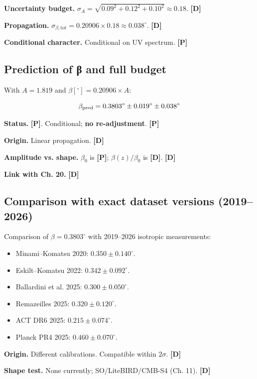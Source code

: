 ﻿\documentclass[11pt,letterpaper]{article}
\begin{document}
\textbf{Uncertainty budget.} $\sigma_A = \sqrt{0{.}09^2 + 0{.}12^2 + 0{.}10^2} \approx 0{.}18$. \textbf{[D]}

\textbf{Propagation.} $\sigma_{\beta,\text{tot}} = 0{.}20906 \times 0{.}18 \approx 0{.}038^\circ$. \textbf{[D]}

\textbf{Conditional character.} Conditional on UV spectrum. \textbf{[P]}
\subsection{Prediction of β and full budget}
With $A = 1{.}819$ and $\beta[^\circ] = 0{.}20906 \times A$:

\begin{equation*}
  \resizebox{\ifdim\width>\linewidth \linewidth\else\width\fi}{!}{$\displaystyle \beta_{\text{pred}} = 0{.}3803^\circ \pm 0{.}019^\circ \pm 0{.}038^\circ$}
\end{equation*}

\textbf{Status.} \textbf{[P]}. Conditional; \textbf{no re-adjustment}. \textbf{[P]}

\textbf{Origin.} Linear propagation. \textbf{[D]}

\textbf{Amplitude vs. shape.} $\beta_0$ is \textbf{[P]}; $\beta(z)/\beta_0$ is \textbf{[D]}. \textbf{[D]}

\textbf{Link with Ch. 20.} \textbf{[D]}
\subsection{Comparison with exact dataset versions (2019–2026)}
Comparison of $\beta = 0{.}3803^\circ$ with 2019--2026 isotropic measurements:

\begin{itemize}[leftmargin=*]
\item Minami--Komatsu 2020: $0{.}350 \pm 0{.}140^\circ$.
\item Eskilt--Komatsu 2022: $0{.}342 \pm 0{.}092^\circ$.
\item Ballardini et al. 2025: $0{.}300 \pm 0{.}050^\circ$.
\item Remazeilles 2025: $0{.}320 \pm 0{.}120^\circ$.
\item ACT DR6 2025: $0{.}215 \pm 0{.}074^\circ$.
\item Planck PR4 2025: $0{.}460 \pm 0{.}070^\circ$.
\end{itemize}

\textbf{Origin.} Different calibrations. Compatible within $2\sigma$. \textbf{[D]}

\textbf{Shape test.} None currently; SO/LiteBIRD/CMB-S4 (Ch. 11). \textbf{[D]}
\end{document}
